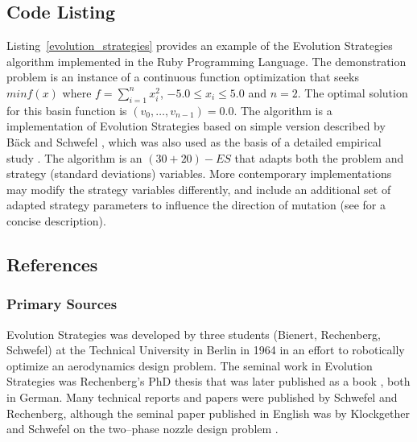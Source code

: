 \subsection{Code Listing}
Listing~\ref{evolution_strategies} provides an example of the Evolution Strategies algorithm implemented in the Ruby Programming Language.
The demonstration problem is an instance of a continuous function optimization that seeks $min f(x)$ where $f=\sum_{i=1}^n x_{i}^2$, $-5.0\leq x_i \leq 5.0$ and $n=2$. The optimal solution for this basin function is $(v_0,\ldots,v_{n-1})=0.0$.
The algorithm is a implementation of Evolution Strategies based on simple version described by B\"ack and Schwefel \cite{Back1993b}, which was also used as the basis of a detailed empirical study \cite{Yao1997}.
The algorithm is an $(30+20)-ES$ that adapts both the problem and strategy (standard deviations) variables. 
More contemporary implementations may modify the strategy variables differently, and include an additional set of adapted strategy parameters to influence the direction of mutation (see \cite{Rudolph2000} for a concise description).




\subsection{References}

% 
% 
\subsubsection{Primary Sources}
Evolution Strategies was developed by three students (Bienert, Rechenberg, Schwefel) at the Technical University in Berlin in 1964 in an effort to robotically optimize an aerodynamics design problem.
The seminal work in Evolution Strategies was Rechenberg's PhD thesis  \cite{Rechenberg1971} that was later published as a book \cite{Rechenberg1973}, both in German.
Many technical reports and papers were published by Schwefel and Rechenberg, although the seminal paper published in English was by Klockgether and Schwefel on the two--phase nozzle design problem \cite{Klockgether1970}.

